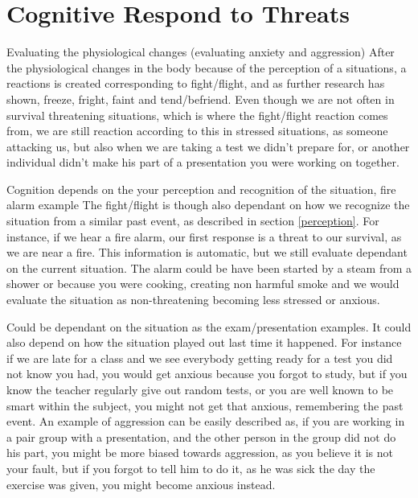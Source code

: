 \section{Cognitive Respond to Threats}

Evaluating the physiological changes (evaluating anxiety and aggression)
After the physiological changes in the body because of the perception of a situations, a reactions is created corresponding to fight/flight, and as further research has shown, freeze, fright, faint and tend/befriend. Even though we are not often in survival threatening situations, which is where the fight/flight reaction comes from, we are still reaction according to this in stressed situations, as someone attacking us, but also when we are taking a test we didn't prepare for, or another individual didn't make his part of a presentation you were working on together.

Cognition depends on the your perception and recognition of the situation, fire alarm example
The fight/flight is though also dependant on how we recognize the situation from a similar past event, as described in section \ref{perception}. For instance, if we hear a fire alarm, our first response is a threat to our survival, as we are near a fire. This information is automatic, but we still evaluate dependant on the current situation. The alarm could be have been started by a steam from a shower or because you were cooking, creating non harmful smoke and we would evaluate the situation as non-threatening becoming less stressed or anxious.

Could be dependant on the situation as the exam/presentation examples.
It could also depend on how the situation played out last time it happened. For instance if we are late for a class and we see everybody getting ready for a test you did not know you had, you would get anxious because you forgot to study, but if you know the teacher regularly give out random tests, or you are well known to be smart within the subject, you might not get that anxious, remembering the past event.
An example of aggression can be easily described as, if you are working in a pair group with a presentation, and the other person in the group did not do his part, you might be more biased towards aggression, as you believe it is not your fault, but if you forgot to tell him to do it, as he was sick the day the exercise was given, you might become anxious instead. \cite{Bodily changes in pain, hunger, fear and rage}

